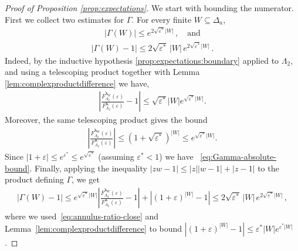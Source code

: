 \documentclass[10pt]{amsart}
\theoremstyle{definition}
\theoremstyle{remark}
\def\eps{{\varepsilon}}
\newcommand{\region}{\Lambda}
\newcommand{\activities}{\pmb{\lambda}}
\newcommand{\size}[1]{\left\lvert#1\right\rvert}
\newcommand{\absolute}[1]{\left\lvert#1\right\rvert}
\newcommand{\epsbound}{\varepsilon^{*}}
\begin{document}
\begin{proof}[Proof of Proposition \ref{prop:expectations}]
		We start with bounding the numerator.
		First we collect two estimates for \(\Gamma\). For every finite $W\subseteq \Delta_a$,
		\begin{align}\label{eq:Gamma-absolute-bound}
			|\Gamma(W)|
			\le
			e^{2\sqrt{\epsbound}\size W}\, ,\quad \text{and}
		\end{align}
		\begin{align}\label{eq:Gamma-close-to-one}
			|\Gamma(W)-1|
			\leq 
			2\sqrt{\epsbound}\,\size W\,e^{2\sqrt{\epsbound}\size W}\, .
		\end{align}
		Indeed, by the inductive hypothesis \ref{prop:expectations:boundary} applied to $\region_2$, and using a telescoping product together with Lemma \ref{lem:complexproductdifference} we have,
		\begin{align} \label{eq:annulus-ratio-close}
			\absolute{
				\frac{
					F_{\region_2}^{\activities_W}(\varepsilon)}
				{F_{\region_2}^{\activities}(\varepsilon)}
				-1
			}
			\le
			\sqrt{\epsbound}\absolute{W}e^{\sqrt{\epsbound}\absolute{W}}.
		\end{align}
		Moreover, the same telescoping product
		gives the bound
		\begin{align}\label{eq:annulus-ratio-bd}
			\left|
			\frac{
				F_{\region_2}^{\activities_W}(\varepsilon)}
			{F_{\region_2}^{\activities}(\varepsilon)}
			\right|
			\le
			(1+\sqrt{\epsbound})^{\size W}
			\le
			e^{\sqrt{\epsbound}\size W}.
		\end{align}
		Since \(|1+\varepsilon|\le e^{\epsbound}\le e^{\sqrt{\epsbound}}\) (assuming \(\epsbound<1\)) we have
		~\eqref{eq:Gamma-absolute-bound}.
		Finally, applying the inequality $|zw-1|\leq |z||w-1|+|z-1|$
		to the product defining \(\Gamma\), we get
		\begin{align*}
			|\Gamma(W)-1|
			\le
			e^{\sqrt{\epsbound}\absolute{W}}
			\absolute{
				\frac{
					F_{\region_2}^{\activities_W}(\varepsilon)}
				{F_{\region_2}^{\activities}(\varepsilon)}
				-1
			}
			+
			\absolute{(1+\eps)^{|W|}-1}
			\leq 
			2\sqrt{\epsbound}\,\size W\,e^{2\sqrt{\epsbound}\size W}\, ,
		\end{align*}
		where we used~\eqref{eq:annulus-ratio-close} and  Lemma~\ref{lem:complexproductdifference} to bound $\absolute{(1+\eps)^{|W|}-1}\leq \epsbound\absolute{W}e^{\epsbound\absolute{W}}$.
		

\end{proof}
\end{document}
